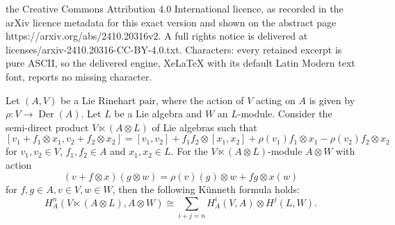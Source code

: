 \documentclass[10pt,a4paper]{amsart}
\newcommand{\Der}{{\operatorname{Der}}}
\begin{document}
the Creative Commons Attribution 4.0 International licence, as recorded in the arXiv licence metadata for this exact version and shown on the abstract page https://arxiv.org/abs/2410.20316v2. A full rights notice is delivered at licenses/arxiv-2410.20316-CC-BY-4.0.txt. Characters: every retained excerpt is pure ASCII, so the delivered engine, XeLaTeX with its default Latin Modern text font, reports no missing character.
\begin{theorem}\label{theorem:Kunnethsemidirect}
Let $(A, V)$ be a Lie Rinehart pair, where the action of $V$ acting on $A$ is given by $\rho: V \rightarrow \Der(A)$. Let $L$ be a Lie algebra and $W$ an $L$-module. Consider the semi-direct product $V \ltimes (A \otimes L)$ of Lie algebras %
such that
\[
[v_1 + f_1 \otimes x_1, v_2 + f_2 \otimes x_2] = [v_1, v_2] + f_1f_2 \otimes[x_1, x_2] + \rho(v_1)f_1 \otimes x_1 - \rho(v_2)f_2 \otimes x_2
\]
for $v_1, v_2 \in V$, $f_1, f_2 \in A$ and $x_1, x_2 \in L$. For the $V \ltimes (A \otimes L)$-module $A \otimes W$  with action 
\[
(v + f \otimes x) (g \otimes w) = \rho(v)(g) \otimes w + fg \otimes x(w)
\]
for $f,g \in A, v \in V, w \in W$, then the following K\"unneth formula holds:
\[
H_A^{n}(V\ltimes (A \otimes L), A \otimes W) \cong \sum_{i+j =n} H_A^i(V, A) \otimes H^j(L, W) .
\]
\end{theorem}
\end{document}
